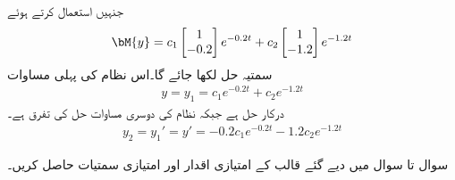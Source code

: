 جنہیں استعمال کرتے ہوئے
\begin{align*}
\bM{y}=c_1\begin{bmatrix*} 1 \\ -0.2  \end{bmatrix*}e^{-0.2 t}+c_2 \begin{bmatrix*}  1 \\ -1.2 \end{bmatrix*} e^{-1.2 t}
\end{align*}
سمتیہ حل لکھا جائے گا۔اس نظام کی پہلی مساوات
\begin{align*}
y=y_1=c_1e^{-0.2 t}+c_2e^{-1.2 t}
\end{align*}
درکار حل ہے جبکہ نظام کی دوسری مساوات حل کی تفرق ہے۔
\begin{align*}
y_2=y_1'=y'=-0.2c_1e^{-0.2 t}-1.2c_2e^{-1.2t}
\end{align*}

سوال  تا سوال  میں دیے گئے قالب کے امتیازی اقدار اور امتیازی سمتیات حاصل کریں۔

